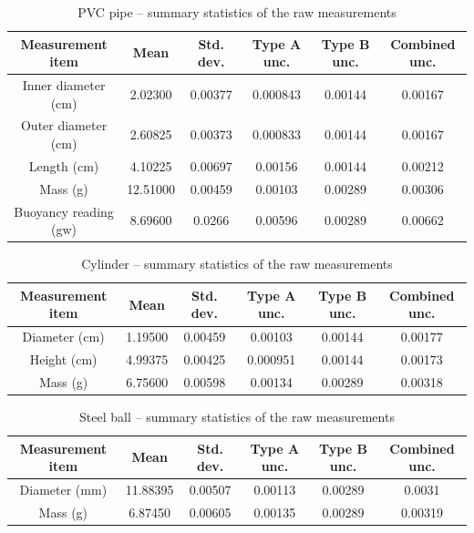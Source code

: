 \begin{table}[htb!]
\centering
\caption{PVC pipe -- summary statistics of the raw measurements}
\begin{tabular}{cccccc}
\toprule
Measurement item & Mean & Std. dev. & Type A unc. & Type B unc. & Combined unc. \\
\midrule
Inner diameter (\unit{\cm}) & 2.02300 & 0.00377 & 0.000843 & 0.00144 & 0.00167 \\
Outer diameter (\unit{\cm}) & 2.60825 & 0.00373 & 0.000833 & 0.00144 & 0.00167 \\
Length (\unit{\cm}) & 4.10225 & 0.00697 & 0.00156 & 0.00144 & 0.00212 \\
Mass (\unit{\g}) & 12.51000 & 0.00459 & 0.00103 & 0.00289 & 0.00306 \\
Buoyancy reading (\unit{gw}) & 8.69600 & 0.0266 & 0.00596 & 0.00289 & 0.00662 \\
\bottomrule
\end{tabular}
\end{table}
\begin{table}[htb!]
\centering
\caption{Cylinder -- summary statistics of the raw measurements}
\begin{tabular}{cccccc}
\toprule
Measurement item & Mean & Std. dev. & Type A unc. & Type B unc. & Combined unc. \\
\midrule
Diameter (\unit{\cm}) & 1.19500 & 0.00459 & 0.00103 & 0.00144 & 0.00177 \\
Height (\unit{\cm}) & 4.99375 & 0.00425 & 0.000951 & 0.00144 & 0.00173 \\
Mass (\unit{\g}) & 6.75600 & 0.00598 & 0.00134 & 0.00289 & 0.00318 \\
\bottomrule
\end{tabular}
\end{table}
\begin{table}[htb!]
\centering
\caption{Steel ball -- summary statistics of the raw measurements}
\begin{tabular}{cccccc}
\toprule
Measurement item & Mean & Std. dev. & Type A unc. & Type B unc. & Combined unc. \\
\midrule
Diameter (\unit{\mm}) & 11.88395 & 0.00507 & 0.00113 & 0.00289 & 0.0031 \\
Mass (\unit{\g}) & 6.87450 & 0.00605 & 0.00135 & 0.00289 & 0.00319 \\
\bottomrule
\end{tabular}
\end{table}
